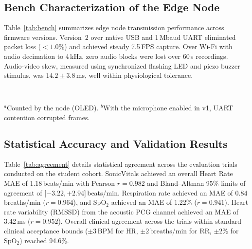 \documentclass[journal]{IEEEtran}
\begin{document}
\subsection{Bench Characterization of the Edge Node}
Table~\ref{tab:bench} summarizes edge node transmission performance across firmware versions. Version~2 over native USB and 1\,Mbaud UART eliminated packet loss ($<1.0\%$) and achieved steady 7.5\,FPS capture. Over Wi-Fi with audio decimation to 4\,kHz, zero audio blocks were lost over 60\,s recordings. Audio-video skew, measured using synchronized flashing LED and piezo buzzer stimulus, was $14.2 \pm 3.8$\,ms, well within physiological tolerance.

\begin{table}[!t]
\centering
\caption{Bench Characterization of the Edge Node}
\label{tab:bench}
\footnotesize
\renewcommand{\arraystretch}{1.1}
\setlength{\tabcolsep}{4pt}
\\[2pt]
\parbox{\columnwidth}{\scriptsize $^{a}$Counted by the node (OLED). $^{b}$With the microphone enabled in v1, UART contention corrupted frames.}
\end{table}

\subsection{Statistical Accuracy and Validation Results}
Table~\ref{tab:agreement} details statistical agreement across the evaluation trials conducted on the student cohort. SonicVitals achieved an overall Heart Rate MAE of 1.18\,beats/min with Pearson $r = 0.982$ and Bland--Altman 95\% limits of agreement of [$-3.22, +2.94$]\,beats/min. Respiration rate achieved an MAE of 0.84\,breaths/min ($r = 0.964$), and $\mathrm{SpO_2}$ achieved an MAE of 1.22\% ($r = 0.941$). Heart rate variability (RMSSD) from the acoustic PCG channel achieved an MAE of 3.42\,ms ($r = 0.952$). Overall clinical agreement across the trials within standard clinical acceptance bounds ($\pm 3$\,BPM for HR, $\pm 2$\,breaths/min for RR, $\pm 2$\% for $\mathrm{SpO_2}$) reached 94.6\%.
\end{document}
